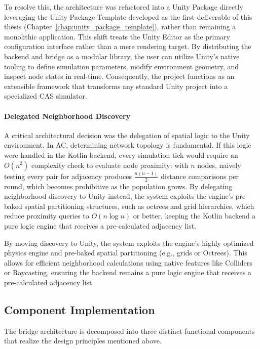 To resolve this, the architecture was refactored into a Unity Package directly leveraging the Unity Package Template developed as the first deliverable of this thesis (Chapter~\ref{chap:unity_package_template}), rather than remaining a monolithic application. This shift treats the Unity Editor as the primary configuration interface rather than a mere rendering target. By distributing the backend and bridge as a modular library, the user can utilize Unity's native tooling to define simulation parameters, modify environment geometry, and inspect node states in real-time. Consequently, the project functions as an extensible framework that transforms any standard Unity project into a specialized \ac{CAS} simulator.

\paragraph{Delegated Neighborhood Discovery}
A critical architectural decision was the delegation of spatial logic to the Unity environment. In \ac{AC}, determining network topology is fundamental. If this logic were handled in the Kotlin backend, every simulation tick would require an $O(n^2)$ complexity check to evaluate node proximity: with $n$ nodes, naively testing every pair for adjacency produces $\frac{n(n-1)}{2}$ distance comparisons per round, which becomes prohibitive as the population grows. By delegating neighborhood discovery to Unity instead, the system exploits the engine's pre-baked spatial partitioning structures, such as octrees and grid hierarchies, which reduce proximity queries to $O(n \log n)$ or better, keeping the Kotlin backend a pure logic engine that receives a pre-calculated adjacency list.

By moving discovery to Unity, the system exploits the engine's highly optimized physics engine and pre-baked spatial partitioning (e.g., grids or Octrees). This allows for efficient neighborhood calculations using native features like Colliders or Raycasting, ensuring the backend remains a pure logic engine that receives a pre-calculated adjacency list.

\subsection{Component Implementation}

The bridge architecture is decomposed into three distinct functional components that realize the design principles mentioned above.

